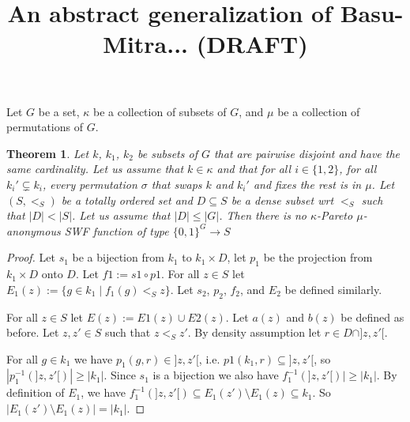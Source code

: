 \documentclass[11pt]{article}
\title{An abstract generalization of Basu-Mitra... (DRAFT)}
\newtheorem{theorem}[definition]{Theorem}
\begin{document}
\maketitle


Let $G$ be a set, $\kappa$ be a collection of subsets of $G$, and $\mu$ be a collection of permutations of $G$.

\begin{theorem}
Let $k$, $k_1$, $k_2$ be subsets of $G$ that are pairwise disjoint and have
the same cardinality. Let us assume that $k \in \kappa$ and that for all $i \in
\{1,2\}$, for all $k_i' \subsetneq k_i$, every permutation $\sigma$ that swaps $k$
and $k_i'$ and fixes the rest is in $\mu$. Let $(S,<_S)$ be a totally ordered set and $D \subseteq S$ be a dense subset wrt $<_S$ such that $|D| < |S|$. Let us assume that $|D| \leq |G|$. Then there is no $\kappa$-Pareto $\mu$-anonymous SWF function of type $\{0,1\}^G \to S$  
 
\end{theorem}

\begin{proof}
Let $s_1$ be a bijection from $k_1$ to $k_1 \times D$, let $p_1$ be the projection from $k_1 \times D$ onto $D$. Let $f1 := s1 \circ p1$. For all $z \in S$ let $E_1(z) := \{g \in k_1 \mid f_1(g) <_S z\}$. Let $s_2$, $p_2$, $f_2$, and $E_2$ be defined similarly.

For all $z \in S$ let $E(z) := E1(z) \cup E2(z)$. Let $a(z)$ and $b(z)$ be defined as before. %
Let $z,z' \in S$ such that $z <_S z'$. By density assumption let $r \in D \cap ]z,z'[$.

For all $g \in k_1$ we have  $p_1(g,r) \in ]z,z'[$, i.e. $p1(k_1,r) \subseteq ]z,z'[$, so $|p_1^{-1}(]z,z'[)| \geq |k_1|$. Since $s_1$ is a bijection we also have $f_1^{-1}(]z,z'[)| \geq |k_1|$. By definition of $E_1$, we have $f_1^{-1}(]z,z'[) \subseteq E_1(z') \setminus E_1(z) \subseteq k_1$. So $|E_1(z') \setminus E_1(z)| = |k_1|$.




\end{proof}
\end{document}
